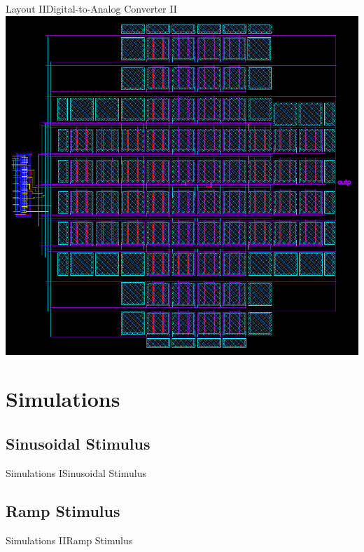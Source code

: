\documentclass{beamer}
\begin{document}
 \begin{frame}{Layout II}{Digital-to-Analog Converter II}
     \centering
     \includegraphics[height=.8\textheight]{img/cap_layout}
 \end{frame}
 
 \section{Simulations}
 \subsection{Sinusoidal Stimulus}
 \begin{frame}{Simulations I}{Sinusoidal Stimulus}
  \centering
  \resizebox{!}{0.8\textheight}{}
 \end{frame}

 \subsection{Ramp Stimulus}
 \begin{frame}{Simulations II}{Ramp Stimulus}
  \centering
  \resizebox{!}{0.8\textheight}{}
 \end{frame}
\end{document}
